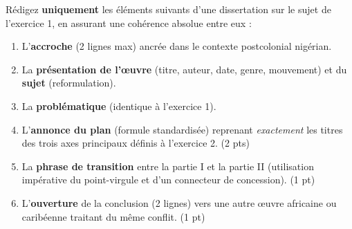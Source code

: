 \documentclass[11pt]{article}
\begin{document}
\begin{exercice}
Rédigez \textbf{uniquement} les éléments suivants d'une dissertation sur le sujet de l'exercice 1, en assurant une cohérence absolue entre eux :

\begin{enumerate}
    \item L'\textbf{accroche} (2 lignes max) ancrée dans le contexte postcolonial nigérian.
    \item La \textbf{présentation de l'œuvre} (titre, auteur, date, genre, mouvement) et du \textbf{sujet} (reformulation).
    \item La \textbf{problématique} (identique à l'exercice 1).
    \item L'\textbf{annonce du plan} (formule standardisée) reprenant \textit{exactement} les titres des trois axes principaux définis à l'exercice 2. (2 pts)
    \item La \textbf{phrase de transition} entre la partie I et la partie II (utilisation impérative du point-virgule et d'un connecteur de concession). (1 pt)
    \item L'\textbf{ouverture} de la conclusion (2 lignes) vers une autre œuvre africaine ou caribéenne traitant du même conflit. (1 pt)
\end{enumerate}
\end{exercice}
\end{document}
